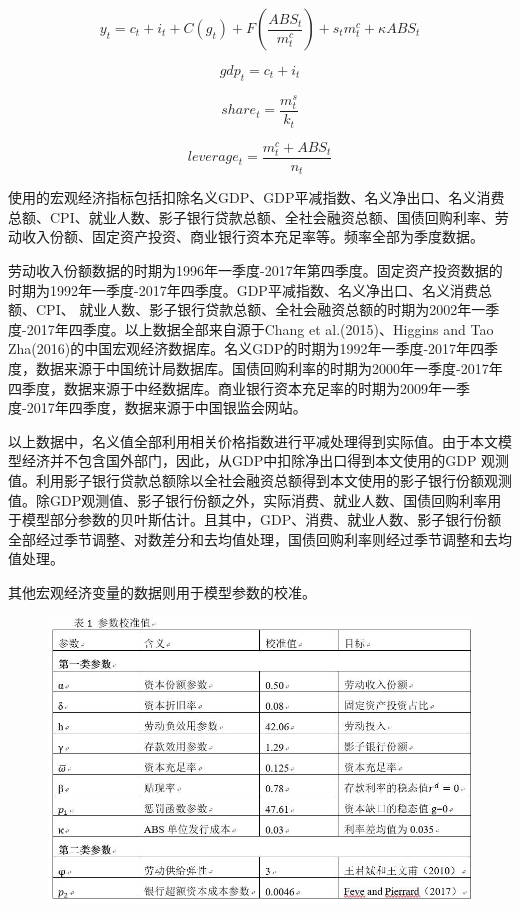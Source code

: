 \documentclass[cn,10pt,math=newtx,citestyle=gb7714-2015,bibstyle=gb7714-2015]{elegantbook}
\begin{document}
	\begin{equation}\label{label}
		y_t=c_t+i_t+C(g_t)+F(\frac{ABS_t}{m_t^c})+s_tm_t^c+\kappa ABS_t
	\end{equation}
	
	\begin{equation}\label{label}
		gdp_t=c_t+i_t
	\end{equation}
	
	\begin{equation}\label{label}
		share_t=\frac{m_t^s}{k_t}
	\end{equation}
	
	\begin{equation}\label{label}
		leverage_t=\frac{m_t^c+ABS_t}{n_t}
	\end{equation}
	
	使用的宏观经济指标包括扣除名义GDP、GDP平减指数、名义净出口、名义消费总额、CPI、就业人数、影子银行贷款总额、全社会融资总额、国债回购利率、劳动收入份额、固定资产投资、商业银行资本充足率等。频率全部为季度数据。
	
	劳动收入份额数据的时期为1996年一季度-2017年第四季度。固定资产投资数据的时期为1992年一季度-2017年四季度。GDP平减指数、名义净出口、名义消费总额、CPI、 就业人数、影子银行贷款总额、全社会融资总额的时期为2002年一季度-2017年四季度。以上数据全部来自源于Chang et al.(2015)、Higgins and Tao Zha(2016)的中国宏观经济数据库。名义GDP的时期为1992年一季度-2017年四季度，数据来源于中国统计局数据库。国债回购利率的时期为2000年一季度-2017年四季度，数据来源于中经数据库。商业银行资本充足率的时期为2009年一季度-2017年四季度，数据来源于中国银监会网站。
	
	以上数据中，名义值全部利用相关价格指数进行平减处理得到实际值。由于本文模型经济并不包含国外部门，因此，从GDP中扣除净出口得到本文使用的GDP 观测值。利用影子银行贷款总额除以全社会融资总额得到本文使用的影子银行份额观测值。除GDP观测值、影子银行份额之外，实际消费、就业人数、国债回购利率用于模型部分参数的贝叶斯估计。且其中，GDP、消费、就业人数、影子银行份额全部经过季节调整、对数差分和去均值处理，国债回购利率则经过季节调整和去均值处理。
	
	其他宏观经济变量的数据则用于模型参数的校准。
	
	\begin{figure}[htbp!]
		\centering
		\includegraphics[width=0.8\linewidth]{FIG/table1}
		\centering
	\end{figure}
	
\end{document}
